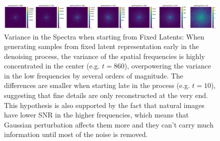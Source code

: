 \begin{figure}[h]
    \centering
    \includegraphics[width=\textwidth]{images/fixedlatents_varSpectra.png}
    \caption[Spectral Variance from Fixed Latents]{Variance in the Spectra when starting from Fixed Latents: When generating samples from fixed latent representation early in the denoising process, the variance of the spatial frequencies is highly concentrated in the center (e.g. $t=860$), overpowering the variance in the low frequencies by several orders of magnitude. The differences are smaller when starting late in the process (e.g. $t=10$), suggesting that fine details are only reconstructed at the very end. This hypothesis is also supported by the fact that natural images have lower SNR in the higher frequencies, which means that Gaussian perturbation affects them more and they can't carry much information until most of the noise is removed.}
    \label{fig:spectralvariance}
\end{figure}


